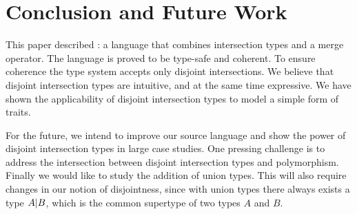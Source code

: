\section{Conclusion and Future Work}
\label{sec:conclusion}

This paper described \name: a language that combines
intersection types and a merge operator.
The language is proved to be type-safe and coherent.
To ensure coherence the type system accepts only
disjoint intersections. We believe that disjoint intersection types are
intuitive, and at the same time expressive. We have shown the
applicability of disjoint intersection types to model a simple form of traits.

\begin{comment}
We implemented the core functionalities of the \name as part of a JVM-based
compiler. Based on the type system of \name, we have built an ML-like
source language compiler that offers interoperability with Java (such as object
creation and method calls). The source language is loosely based on the more
general System $F_{\omega}$ and supports a
number of other features, including records, polymorphism, mutually recursive
\code{let} bindings, type aliases, algebraic data types, pattern matching, and
first-class modules that are encoded using \code{letrec} and records.
\end{comment}

For the future, we intend to improve our source language
and show the power of disjoint intersection types in large case
studies. One pressing challenge is to address the intersection between 
disjoint intersection types and polymorphism.
Finally we would like to study the
addition of union types. This will also require changes in our
notion of disjointness, since with union types there always exists
a type $A | B$, which is the common supertype of two
types $A$ and $B$.

